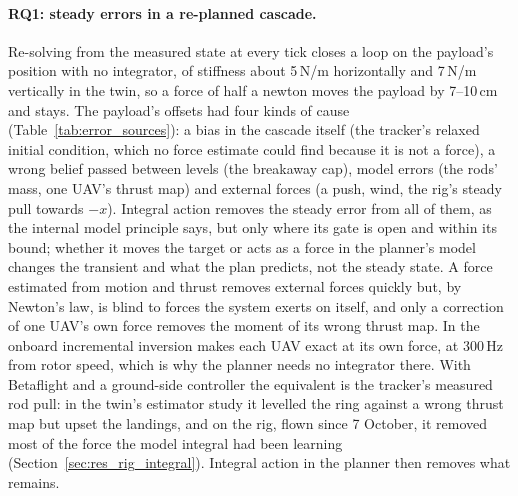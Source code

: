 \paragraph{RQ1: steady errors in a re-planned cascade.} Re-solving from the measured state at every tick closes a
loop on the payload's position with no integrator, of stiffness about 5\,N/m horizontally and 7\,N/m vertically
in the twin, so a force of half a newton moves the payload by 7--10\,cm and stays. The payload's offsets had four
kinds of cause (Table~\ref{tab:error_sources}): a bias in the cascade itself (the tracker's relaxed initial
condition, which no force estimate could find because it is not a force), a wrong belief passed between levels
(the breakaway cap), model errors (the rods' mass, one UAV's thrust map) and external forces (a push, wind, the
rig's steady pull towards $-x$). Integral action removes the steady error from all of them, as the internal
model principle says, but only where its gate is open and within its bound; whether it moves the target or acts
as a force in the planner's model changes the transient and what the plan predicts, not the steady state. A
force estimated from motion and thrust removes external forces quickly but, by Newton's law, is blind to forces
the system exerts on itself, and only a correction of one UAV's own force removes the moment of its wrong thrust
map. In \cite{tudelft} the onboard incremental inversion makes each UAV exact at its own force, at 300\,Hz from
rotor speed, which is why the planner needs no integrator there. With Betaflight and a ground-side controller the
equivalent is the tracker's measured rod pull: in the twin's estimator study it levelled the ring against a wrong
thrust map but upset the landings, and on the rig, flown since 7 October, it removed most of the force the
model integral had been learning (Section~\ref{sec:res_rig_integral}). Integral action in the planner then
removes what remains.

